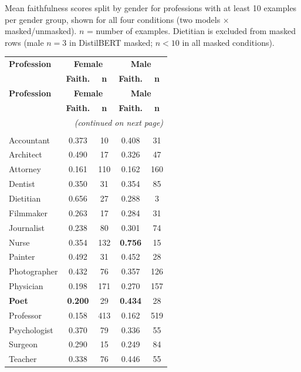 \documentclass[11pt]{article}
\begin{document}
Mean faithfulness scores split by gender for professions with at least
10 examples per gender group, shown for all four conditions
(two models $\times$ masked/unmasked).
$n$ = number of examples. Dietitian is excluded from masked rows
(male $n{=}3$ in DistilBERT masked; $n{<}10$ in all masked conditions).

\small
\begin{longtable}{lcccc}
\toprule
\textbf{Profession} & \multicolumn{2}{c}{\textbf{Female}} &
\multicolumn{2}{c}{\textbf{Male}} \\
& \textbf{Faith.} & \textbf{n} & \textbf{Faith.} & \textbf{n} \\
\midrule
\endfirsthead
\toprule
\textbf{Profession} & \multicolumn{2}{c}{\textbf{Female}} &
\multicolumn{2}{c}{\textbf{Male}} \\
& \textbf{Faith.} & \textbf{n} & \textbf{Faith.} & \textbf{n} \\
\midrule
\endhead
\midrule
\multicolumn{5}{r}{\small\textit{(continued on next page)}} \\
\endfoot
\bottomrule
\endlastfoot
\multicolumn{5}{l}{\textit{DistilBERT --- unmasked}} \\
\midrule
Accountant    & 0.373 &  10 & 0.408 &  31 \\
Architect     & 0.490 &  17 & 0.326 &  47 \\
Attorney      & 0.161 & 110 & 0.162 & 160 \\
Dentist       & 0.350 &  31 & 0.354 &  85 \\
Dietitian     & 0.656 &  27 & 0.288 &   3 \\
Filmmaker     & 0.263 &  17 & 0.284 &  31 \\
Journalist    & 0.238 &  80 & 0.301 &  74 \\
Nurse         & 0.354 & 132 & \textbf{0.756} & 15 \\
Painter       & 0.492 &  31 & 0.452 &  28 \\
Photographer  & 0.432 &  76 & 0.357 & 126 \\
Physician     & 0.198 & 171 & 0.270 & 157 \\
\textbf{Poet} & \textbf{0.200} &  29 & \textbf{0.434} &  28 \\
Professor     & 0.158 & 413 & 0.162 & 519 \\
Psychologist  & 0.370 &  79 & 0.336 &  55 \\
Surgeon       & 0.290 &  15 & 0.249 &  84 \\
Teacher       & 0.338 &  76 & 0.446 &  55 \\

\end{longtable}
\end{document}
